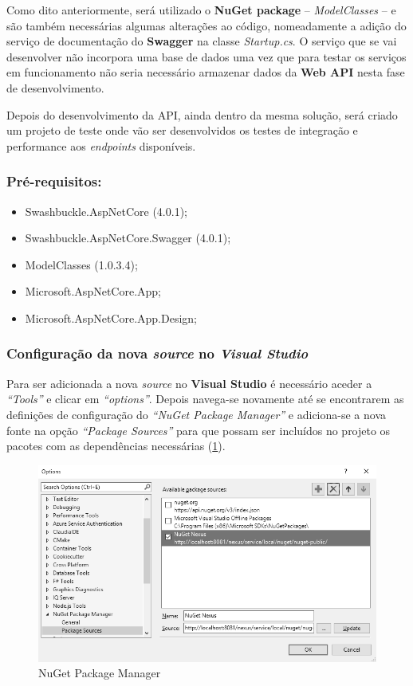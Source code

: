 \hspace{1cm}Como dito anteriormente, será utilizado o \textbf{NuGet package} -- \textit{ModelClasses} -- e são também necessárias algumas alterações ao código, nomeadamente a adição do serviço de documentação do \textbf{Swagger} na classe \textit{Startup.cs}. O serviço que se vai desenvolver não incorpora uma base de dados uma vez que para testar os serviços em funcionamento não seria necessário armazenar dados da \textbf{Web API} nesta fase de desenvolvimento. 

\hspace{1cm}Depois do desenvolvimento da API, ainda dentro da mesma solução, será criado um projeto de teste onde vão ser desenvolvidos os testes de integração e performance aos \textit{endpoints} disponíveis.

\subsubsection{Pré-requisitos:}

\begin{itemize}
 \item Swashbuckle.AspNetCore (4.0.1);
 \item Swashbuckle.AspNetCore.Swagger (4.0.1);
 \item ModelClasses (1.0.3.4);
 \item Microsoft.AspNetCore.App;
 \item Microsoft.AspNetCore.App.Design;
\end{itemize}

\subsubsection{Configuração da nova \textit{source} no \textit{Visual Studio}}

\hspace{1cm}Para ser adicionada a nova \textit{source} no \textbf{Visual Studio} é necessário aceder a \textit{``Tools''} e clicar em \textit{``options''}. Depois navega-se novamente até se encontrarem as definições de configuração do \textit{``NuGet Package Manager''} e adiciona-se a nova fonte na opção \textit{``Package Sources''} para que possam ser incluídos no projeto os pacotes com as dependências necessárias (\ref{Fig:Fig44}).

\begin{figure}[hbt!]
\centering
\includegraphics[width=0.7\linewidth]{Cap5/VSPackageSource.png}
\caption{NuGet Package Manager}
\label{Fig:Fig44}
\end{figure}

